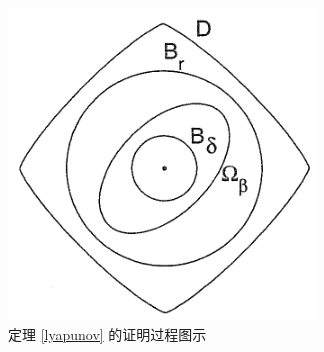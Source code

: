 \begin{figure}[htbp]
  \centering
  \includegraphics[scale=0.55]{figure/nonlinear/lyapunov-proof.png}
  \caption{定理 \ref{lyapunov} 的证明过程图示}
  \label{lyapunov_proof}
\end{figure}
\newpage
